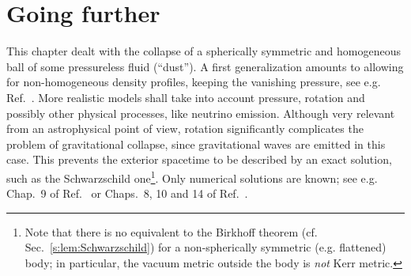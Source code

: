 \section{Going further}

This chapter dealt with the collapse of a spherically symmetric and homogeneous ball of some
pressureless fluid (``dust'').
A first generalization amounts to allowing for non-homogeneous density profiles,
keeping the vanishing pressure, see e.g. Ref.~\cite{PlebaK06}.
More realistic models shall take into account pressure, rotation and possibly
other physical processes, like neutrino emission.
Although very relevant from an astrophysical point of view, rotation
significantly complicates the problem of gravitational collapse,
since gravitational waves are emitted in this case.
This prevents the exterior spacetime to be described by an exact solution,
such as the Schwarzschild one\footnote{Note that there is no equivalent to the Birkhoff theorem
(cf. Sec.~\ref{s:lem:Schwarzschild}) for a non-spherically symmetric (e.g. flattened) body;
in particular, the vacuum metric
outside the body is \emph{not} Kerr metric.}. Only numerical solutions are known;
see e.g. Chap.~9 of Ref.~\cite{Shiba15} or Chaps.~8, 10 and 14 of Ref.~\cite{BaumgS10}.




